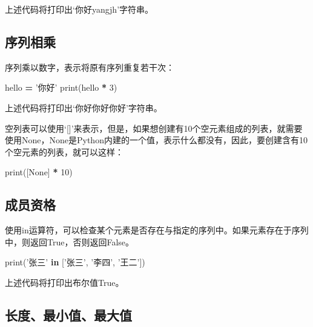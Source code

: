 \documentclass[]{ctexbook}
\newenvironment{Shaded}{\begin{snugshade}}{\end{snugshade}}
\newcommand{\BuiltInTok}[1]{#1}
\newcommand{\DecValTok}[1]{\textcolor[rgb]{0.00,0.00,0.81}{#1}}
\newcommand{\KeywordTok}[1]{\textcolor[rgb]{0.13,0.29,0.53}{\textbf{#1}}}
\newcommand{\NormalTok}[1]{#1}
\newcommand{\OperatorTok}[1]{\textcolor[rgb]{0.81,0.36,0.00}{\textbf{#1}}}
\newcommand{\StringTok}[1]{\textcolor[rgb]{0.31,0.60,0.02}{#1}}
\newcommand{\VariableTok}[1]{\textcolor[rgb]{0.00,0.00,0.00}{#1}}
\begin{document}
上述代码将打印出`你好yangjh'字符串。

\hypertarget{ux5e8fux5217ux76f8ux4e58}{%
\subsection{序列相乘}\label{ux5e8fux5217ux76f8ux4e58}}

序列乘以数字，表示将原有序列重复若干次：

\begin{Shaded}
\begin{Highlighting}[]
\NormalTok{hello }\OperatorTok{=} \StringTok{'你好'}
\BuiltInTok{print}\NormalTok{(hello }\OperatorTok{*} \DecValTok{3}\NormalTok{)}
\end{Highlighting}
\end{Shaded}

上述代码将打印出`你好你好你好'字符串。

空列表可以使用`{[}{]}'来表示，但是，如果想创建有10个空元素组成的列表，就需要使用None，None是Python内建的一个值，表示什么都没有，因此，要创建含有10个空元素的列表，就可以这样：

\begin{Shaded}
\begin{Highlighting}[]
\BuiltInTok{print}\NormalTok{([}\VariableTok{None}\NormalTok{] }\OperatorTok{*} \DecValTok{10}\NormalTok{)}
\end{Highlighting}
\end{Shaded}

\hypertarget{ux6210ux5458ux8d44ux683c}{%
\subsection{成员资格}\label{ux6210ux5458ux8d44ux683c}}

使用in运算符，可以检查某个元素是否存在与指定的序列中。如果元素存在于序列中，则返回True，否则返回False。

\begin{Shaded}
\begin{Highlighting}[]
\BuiltInTok{print}\NormalTok{(}\StringTok{'张三'} \KeywordTok{in}\NormalTok{ [}\StringTok{'张三'}\NormalTok{, }\StringTok{'李四'}\NormalTok{, }\StringTok{'王二'}\NormalTok{])}
\end{Highlighting}
\end{Shaded}

上述代码将打印出布尔值True。

\hypertarget{ux957fux5ea6ux6700ux5c0fux503cux6700ux5927ux503c}{%
\subsection{长度、最小值、最大值}\label{ux957fux5ea6ux6700ux5c0fux503cux6700ux5927ux503c}}
\end{document}
